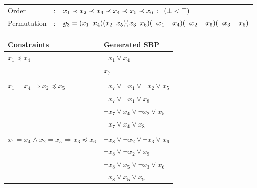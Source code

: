 


\begin{center}
	\begin{tabular}{lll}
		Order &:& $ x_1 \prec x_2 \prec x_3 \prec x_4 \prec x_5 \prec x_6 \enskip ; \enskip  (\bot < \top)$ \\
		Permutation &:& $g_3 = (x_1 \enskip x_4)(x_2 \enskip x_5)(x_3 \enskip x_6)(\neg x_1 \enskip \neg x_4)(\neg x_2 \enskip \neg x_5)(\neg x_3 \enskip \neg x_6)$
	\end{tabular}
	
	\vspace*{2\baselineskip}
	
	\begin{tabular}{ll}
		Constraints & Generated SBP\\
		\midrule
		$x_1 \preceq x_4$ & $ \neg x_1 \lor x_4$ \\
		& $x_7$ \\
		&\\
		$x_1 = x_4 \Rightarrow x_2 \preceq x_5$ &  $ \neg x_7 \lor \neg x_1 \lor \neg x_2 \lor x_5$\\
		& $ \neg x_7 \lor \neg x_1 \lor x_8$\\
		& $ \neg x_7 \lor  x_4 \lor \neg x_2 \lor x_5$ \\
		& $ \neg x_7 \lor x_4 \lor x_8$\\
		
		&\\
		$x_1 = x_4 \land x_2 = x_5 \Rightarrow x_3 \preceq x_6$ 
		& $\neg x_8 \lor \neg x_2 \lor \neg x_3 \lor x_6$\\
		& $\neg x_8 \lor \neg x_2 \lor x_9$\\
		& $\neg x_8 \lor x_5 \lor \neg x_3 \lor x_6$\\
		& $\neg x_8 \lor x_5 \lor x_9$\\

	\end{tabular}
\end{center}